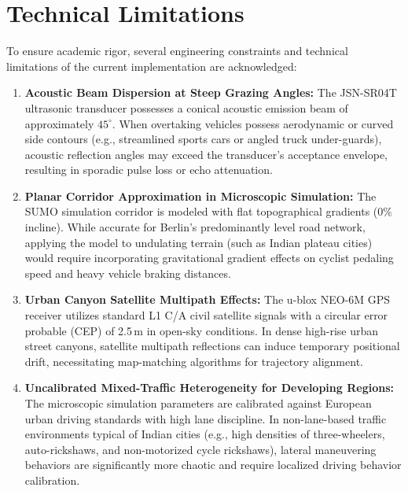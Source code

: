 \section{Technical Limitations}
To ensure academic rigor, several engineering constraints and technical limitations of the current implementation are acknowledged:
\begin{enumerate}
    \item \textbf{Acoustic Beam Dispersion at Steep Grazing Angles:} The JSN-SR04T ultrasonic transducer possesses a conical acoustic emission beam of approximately $45^\circ$. When overtaking vehicles possess aerodynamic or curved side contours (e.g., streamlined sports cars or angled truck under-guards), acoustic reflection angles may exceed the transducer's acceptance envelope, resulting in sporadic pulse loss or echo attenuation.
    \item \textbf{Planar Corridor Approximation in Microscopic Simulation:} The SUMO simulation corridor is modeled with flat topographical gradients ($0\%$ incline). While accurate for Berlin's predominantly level road network, applying the model to undulating terrain (such as Indian plateau cities) would require incorporating gravitational gradient effects on cyclist pedaling speed and heavy vehicle braking distances.
    \item \textbf{Urban Canyon Satellite Multipath Effects:} The u-blox NEO-6M GPS receiver utilizes standard L1 C/A civil satellite signals with a circular error probable (CEP) of 2.5\,m in open-sky conditions. In dense high-rise urban street canyons, satellite multipath reflections can induce temporary positional drift, necessitating map-matching algorithms for trajectory alignment.
    \item \textbf{Uncalibrated Mixed-Traffic Heterogeneity for Developing Regions:} The microscopic simulation parameters are calibrated against European urban driving standards with high lane discipline. In non-lane-based traffic environments typical of Indian cities (e.g., high densities of three-wheelers, auto-rickshaws, and non-motorized cycle rickshaws), lateral maneuvering behaviors are significantly more chaotic and require localized driving behavior calibration.
\end{enumerate}

